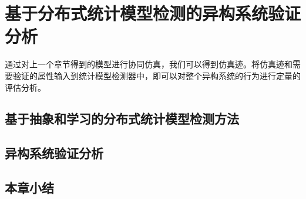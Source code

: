 \chapter{基于分布式统计模型检测的异构系统验证分析}
\label{ch4}
通过对上一个章节得到的模型进行协同仿真，我们可以得到仿真迹。将仿真迹和需要验证的属性输入到统计模型检测器中，即可以对整个异构系统的行为进行定量的评估分析。
\section{基于抽象和学习的分布式统计模型检测方法}

\section{异构系统验证分析}

\section{本章小结}
